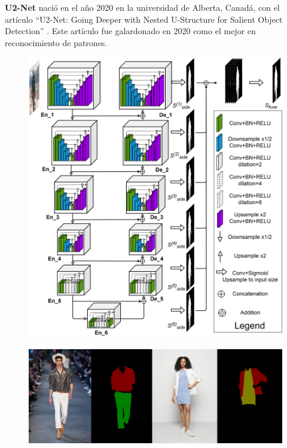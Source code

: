\documentclass[12pt]{report} %
\begin{document}
	\textbf{U2-Net} nació en el año 2020 en la universidad de Alberta, Canadá, con
	el artículo ``U2-Net: Going Deeper with Nested U-Structure for Salient Object Detection'' \cite{u2net}. Este artículo fue galardonado
	en 2020 como el mejor en reconocimiento de patrones.
	\begin{figure}[H]
		{\includegraphics[scale=0.4]{u2net.png}}
	\end{figure}
	\begin{figure}[H]
		{\includegraphics[scale=0.4]{u2net-mascara.jpg}}
	\end{figure}
\end{document}

